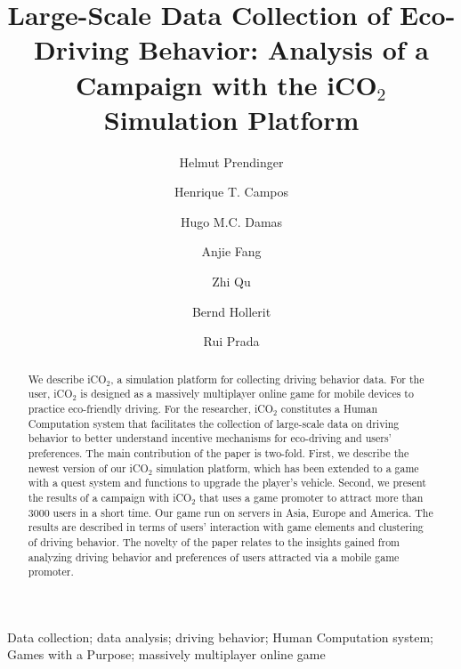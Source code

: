 \documentclass[preprint,authoryear,12pt]{elsarticle}
\date{}
\begin{document}
\begin{frontmatter}
\title{Large-Scale Data Collection of Eco-Driving Behavior:
Analysis of a Campaign with the iCO$_2$ Simulation Platform}

\author[label1]{Helmut Prendinger}
\author[label2]{Henrique T. Campos}
\author[label2]{Hugo M.C. Damas}
\author[label1]{Anjie Fang}
\author[label1]{Zhi Qu}
\author[label1]{Bernd Hollerit}
\author[label2]{Rui Prada}



\address[label1]{{helmut@nii.ac.jp, fanganjie@gmail.com, hollerit@gmail.com, zq12721@my.bristol.ac.uk}\\
	National Institute of Informatics, \\
    2-1-2 Hitotsubashi, Chiyoda-ku, Tokyo, 101-8430, Japan\\}

\address[label2]{{henriquetcampos@gmail.com,hugo.damas@gmail.com,rui.prada@tecnico.ulisboa.pt}\\
    INESC-ID and Instituto Superior T\'{e}cnico, Universidade de Lisboa,\\
    Av. Prof. Cavaco Silva, Taguspark Porto Salvo, Portugal\\}


\begin{abstract}
We describe iCO$_2$, a simulation platform for collecting driving behavior data. For the user, iCO$_2$ is designed as a massively multiplayer online game for mobile devices to practice eco-friendly driving. For the researcher, iCO$_2$ constitutes a Human Computation system that facilitates the collection of large-scale data on driving behavior to better understand incentive mechanisms for eco-driving and users' preferences. The main contribution of the paper is two-fold. First, we describe the newest version of our iCO$_2$ simulation platform, which has been extended to a game with a quest system and functions to upgrade the player's vehicle. Second, we present the results of a campaign with iCO$_2$ that uses a game promoter to attract more than 3000 users in a short time. Our game run on servers in Asia, Europe and America. The results are described in terms of users' interaction with game elements and clustering of driving behavior. The novelty of the paper relates to the insights gained from analyzing driving behavior and preferences of users attracted via a mobile game promoter.
\end{abstract}

\begin{keyword}
Data collection; data analysis; driving behavior; Human Computation system; Games with a Purpose; massively multiplayer online game
\end{keyword}

\end{frontmatter}
\end{document}
